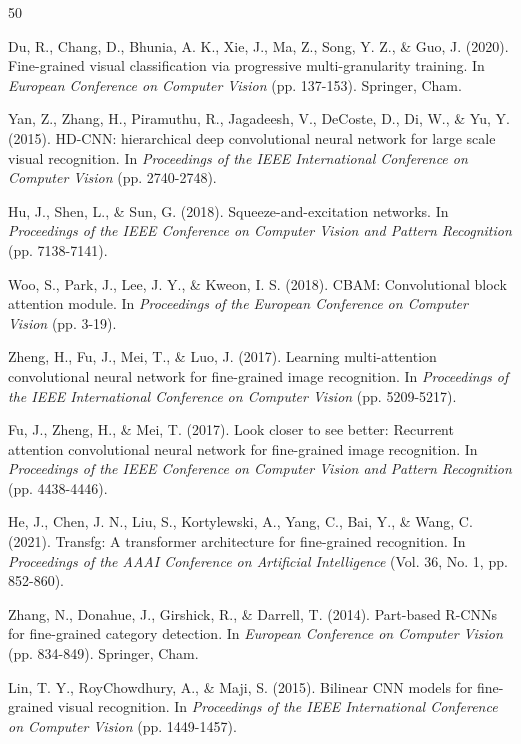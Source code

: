 \documentclass[pdflatex,sn-mathphys-num]{sn-jnl}
\theoremstyle{thmstyleone}%
\theoremstyle{thmstyletwo}%
\theoremstyle{thmstylethree}%
\begin{document}
\begin{thebibliography}{50}

 Du, R., Chang, D., Bhunia, A. K., Xie, J., Ma, Z., Song, Y. Z., \& Guo, J. (2020). Fine-grained visual classification via progressive multi-granularity training. In \textit{European Conference on Computer Vision} (pp. 137-153). Springer, Cham.

 Yan, Z., Zhang, H., Piramuthu, R., Jagadeesh, V., DeCoste, D., Di, W., \& Yu, Y. (2015). HD-CNN: hierarchical deep convolutional neural network for large scale visual recognition. In \textit{Proceedings of the IEEE International Conference on Computer Vision} (pp. 2740-2748).

 Hu, J., Shen, L., \& Sun, G. (2018). Squeeze-and-excitation networks. In \textit{Proceedings of the IEEE Conference on Computer Vision and Pattern Recognition} (pp. 7138-7141).

 Woo, S., Park, J., Lee, J. Y., \& Kweon, I. S. (2018). CBAM: Convolutional block attention module. In \textit{Proceedings of the European Conference on Computer Vision} (pp. 3-19).

 Zheng, H., Fu, J., Mei, T., \& Luo, J. (2017). Learning multi-attention convolutional neural network for fine-grained image recognition. In \textit{Proceedings of the IEEE International Conference on Computer Vision} (pp. 5209-5217).

 Fu, J., Zheng, H., \& Mei, T. (2017). Look closer to see better: Recurrent attention convolutional neural network for fine-grained image recognition. In \textit{Proceedings of the IEEE Conference on Computer Vision and Pattern Recognition} (pp. 4438-4446).

 He, J., Chen, J. N., Liu, S., Kortylewski, A., Yang, C., Bai, Y., \& Wang, C. (2021). Transfg: A transformer architecture for fine-grained recognition. In \textit{Proceedings of the AAAI Conference on Artificial Intelligence} (Vol. 36, No. 1, pp. 852-860).

 Zhang, N., Donahue, J., Girshick, R., \& Darrell, T. (2014). Part-based R-CNNs for fine-grained category detection. In \textit{European Conference on Computer Vision} (pp. 834-849). Springer, Cham.

 Lin, T. Y., RoyChowdhury, A., \& Maji, S. (2015). Bilinear CNN models for fine-grained visual recognition. In \textit{Proceedings of the IEEE International Conference on Computer Vision} (pp. 1449-1457).


\end{thebibliography}
\end{document}
